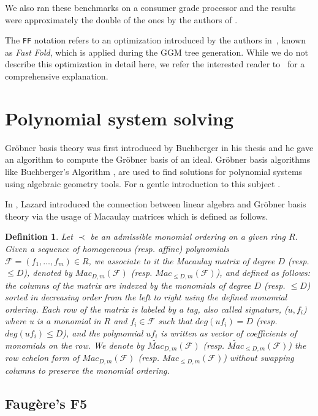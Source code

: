 \documentclass[english]{article}
\newtheorem{definition}{Definition}[section]
\newcommand{\Mac}[3]{{Mac_{#1, #2}(\mathcal{#3})}}
\newcommand{\Mact}[3]{{\widetilde{Mac}_{#1, #2}(\mathcal{#3})}}
\begin{document}
		We also ran these benchmarks on a consumer grade processor and the results were approximately the double of the ones by the authors of \cite{HJ23}.
		
		The \texttt{FF} notation refers to an optimization introduced by the authors in~\cite{HJ23}, known as \emph{Fast Fold}, which is applied during the GGM tree generation. While we do not describe this optimization in detail here, we refer the interested reader to~\cite{HJ23} for a comprehensive explanation.
		
	\section{Polynomial system solving}\label{sec3}
		Gröbner basis theory was first introduced by Buchberger in his thesis \cite{Buc} and he gave an algorithm to compute the Gröbner basis of an ideal.
		Gröbner basis algorithms like Buchberger's Algorithm \cite{Buc}, are used to find solutions for polynomial systems using algebraic geometry tools. For a gentle introduction to this subject \cite{CLS}.
		
		In \cite{Lazard83}, Lazard introduced the connection between linear algebra and Gröbner basis theory via the usage of Macaulay matrices \cite{Mac} which is defined as follows.
		
		\begin{definition}
			Let $\prec$ be an admissible monomial ordering on a given ring $R$. Given a sequence of homogeneous (resp. affine) polynomials $\mathcal{F} = (f_1,\dots,f_m) \in R$, we associate to it the Macaulay matrix of degree $D$ (resp. $\leq D$), denoted by $\Mac{D}{m}{\mathcal{F}}$ (resp. $\Mac{\leq D}{m}{\mathcal{F}}$), and defined as follows: the columns of the matrix are indexed by the monomials of degree $D$ (resp. $\leq D$) sorted in decreasing order from the left to right using the defined monomial ordering. Each row of the matrix is labeled by a tag, also called signature, ($u, f_i$) where u is a monomial in $R$ and $f_i \in \mathcal{F}$ such that $deg(uf_i) = D$ (resp. $deg(uf_i) \leq D$), and the polynomial $uf_i$ is written as vector of coefficients of monomials on the row. We denote by $\Mact{D}{m}{F}$ (resp. $\Mact{\leq D}{m}{F}$) the row echelon form of $\Mac{D}{m}{\mathcal{F}}$ (resp. $\Mac{\leq D}{m}{\mathcal{F}}$) without swapping columns to preserve the monomial ordering.
		\end{definition}
		
		\subsection{Faugère's F5}
		
\end{document}
